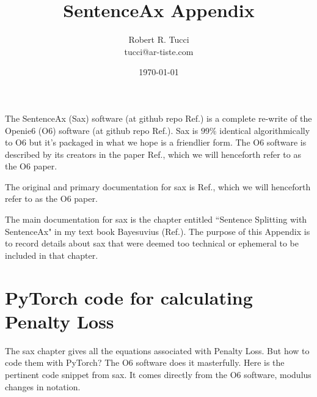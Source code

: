\documentclass[12pt]{article}
\begin{document}
\title{SentenceAx Appendix}
\date{ \today}
\author{Robert R. Tucci\\
        tucci@ar-tiste.com}
\maketitle
The SentenceAx (Sax) software (at github repo Ref.\cite{sentence-ax-github}) is a complete re-write of the Openie6 (O6) software
(at github repo Ref.\cite{openie6-github}).
Sax is $99\%$ identical algorithmically to O6 but it's packaged in what we hope is a friendlier form.
 The O6 software is described by its creators
 in the paper Ref.\cite{openie6-paper},
 which we will henceforth refer to as 
 the O6 paper.
 
 The original and primary documentation 
 for sax is Ref.\cite{openie6-paper}, which we will henceforth refer to as 
 the O6 paper.
 

The main documentation for sax is
the chapter entitled ``Sentence Splitting with SentenceAx" in my text book Bayesuvius (Ref.\cite{bayesuvius}). The purpose of this Appendix is to record details about sax that were deemed too technical or ephemeral to be included in that chapter.


\section{PyTorch code for calculating Penalty Loss}

The sax chapter gives all the equations
associated with Penalty Loss. But how to  code them with PyTorch?  The O6 software does it masterfully. Here is the pertinent code snippet from sax.
It comes directly from the O6 software, modulus changes in notation.
\end{document}
